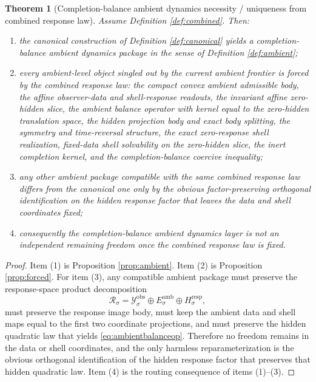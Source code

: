 \documentclass[11pt]{article}
\newcommand{\DataSpace}[1]{\mathcal Y_{#1}^{\mathrm{obs}}}
\newcommand{\AmbientTarget}[1]{E_{#1}^{\mathrm{amb}}}
\newcommand{\ResponseSpace}[1]{\mathcal R_{#1}}
\newcommand{\RespGapSpace}[1]{H_{#1}^{\mathrm{resp}}}
\newtheorem{theorem}{Theorem}
\begin{document}
\begin{theorem}[Completion-balance ambient dynamics necessity / uniqueness from combined response law]
\label{thm:necessity}
Assume Definition \ref{def:combined}. Then:
\begin{enumerate}
    \item the canonical construction of Definition \ref{def:canonical} yields a completion-balance ambient dynamics package in the sense of Definition \ref{def:ambient};
    \item every ambient-level object singled out by the current ambient frontier is forced by the combined response law: the compact convex ambient admissible body, the affine observer-data and shell-response readouts, the invariant affine zero-hidden slice, the ambient balance operator with kernel equal to the zero-hidden translation space, the hidden projection body and exact body splitting, the symmetry and time-reversal structure, the exact zero-response shell realization, fixed-data shell solvability on the zero-hidden slice, the inert completion kernel, and the completion-balance coercive inequality;
    \item any other ambient package compatible with the same combined response law differs from the canonical one only by the obvious factor-preserving orthogonal identification on the hidden response factor that leaves the data and shell coordinates fixed;
    \item consequently the completion-balance ambient dynamics layer is not an independent remaining freedom once the combined response law is fixed.
\end{enumerate}
\end{theorem}

\begin{proof}
Item (1) is Proposition \ref{prop:ambient}. Item (2) is Proposition \ref{prop:forced}. For item (3), any compatible ambient package must preserve the response-space product decomposition
\[
\ResponseSpace{\sigma}
=
\DataSpace{\sigma}\oplus \AmbientTarget{\sigma}\oplus \RespGapSpace{\sigma},
\]
must preserve the response image body, must keep the ambient data and shell maps equal to the first two coordinate projections, and must preserve the hidden quadratic law that yields \eqref{eq:ambientbalanceop}. Therefore no freedom remains in the data or shell coordinates, and the only harmless reparameterization is the obvious orthogonal identification of the hidden response factor that preserves that hidden quadratic law. Item (4) is the routing consequence of items (1)--(3).
\end{proof}
\end{document}
